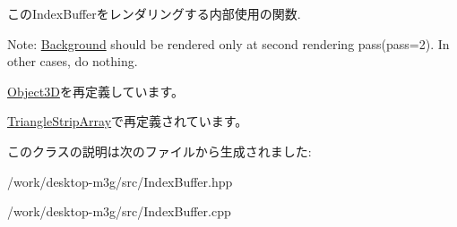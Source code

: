 このIndexBufferをレンダリングする内部使用の関数.

Note: \hyperlink{classm3g_1_1Background}{Background} should be rendered only at second rendering pass(pass=2). In other cases, do nothing. 

\hyperlink{classm3g_1_1Object3D_1efcb1973989d9963d5bd6d03065d389}{Object3D}を再定義しています。

\hyperlink{classm3g_1_1TriangleStripArray_1efcb1973989d9963d5bd6d03065d389}{TriangleStripArray}で再定義されています。

このクラスの説明は次のファイルから生成されました:\begin{CompactItemize}
\item 
/work/desktop-m3g/src/IndexBuffer.hpp\item 
/work/desktop-m3g/src/IndexBuffer.cpp\end{CompactItemize}

